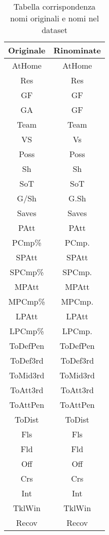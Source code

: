 \begin{table}[!htb]%
	
	\renewcommand{\arraystretch}{1.7}
	\centering
	\begin{tabular}{c c }
		\hline	
		
		\textbf{Originale} & \textbf{Rinominate} \\	
		\hline			
		AtHome & AtHome \\
		Res & Res \\
		GF & GF\\
		GA & GF \\
		Team & Team \\
		VS & Vs\\
		Poss & Poss\\
		Sh & Sh\\
		SoT & SoT\\
		G/Sh & G.Sh \\
		Saves & Saves \\
		PAtt & PAtt \\
		PCmp\% & PCmp.\\
		SPAtt & SPAtt \\
		SPCmp\% & SPCmp.\\
		MPAtt & MPAtt \\
		MPCmp\% & MPCmp.\\
		LPAtt & LPAtt \\
		LPCmp\% & LPCmp. \\
		ToDefPen & ToDefPen \\
		ToDef3rd & ToDef3rd \\
		ToMid3rd & ToMid3rd \\
		ToAtt3rd & ToAtt3rd \\
		ToAttPen & ToAttPen \\
		ToDist & ToDist\\
		Fls & Fls \\
		Fld & Fld \\
		Off & Off \\
		Crs & Crs \\
		Int & Int \\
		TklWin & TklWin \\
		Recov & Recov \\
		\hline
		
	\end{tabular} \hbox{}
	
	\caption{Tabella corrispondenza nomi originali e nomi nel dataset} \label{tab:summary2}
\end{table}
